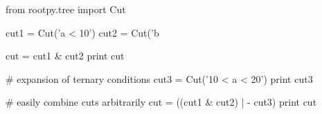 \begin{footnotesize}
\begin{pyglist}[language=python,texcl=true,abovecaptionskip=0,style=vs,bgcolor=Moccasin]
from rootpy.tree import Cut

cut1 = Cut('a < 10')
cut2 = Cut('b %

cut = cut1 & cut2
print cut

# expansion of ternary conditions
cut3 = Cut('10 < a < 20')
print cut3

# easily combine cuts arbitrarily
cut = ((cut1 & cut2) | - cut3)
print cut
\end{pyglist}
\end{footnotesize}
